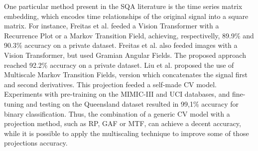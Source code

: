 

One particular method present in the \gls{SQA} literature is the time series matrix embedding, which encodes time relationships of the original signal into a square matrix. For instance, Freitas et al. \cite{imaging-4} feeded a Vision Transformer with a Recurrence Plot or a Markov Transition Field, achieving, respectivelly, 89.9\% and 90.3\% accuracy on a private dataset. Freitas et al. \cite{imaging-5} also feeded images with a Vision Transformer, but used Gramian Angular Fields. The proposed approach reached 92.2\% accuracy on a private dataset. Liu et al. \cite{imaging-6} proposed the use of Multiscale Markov Transition Fields, version which concatenates the signal first and second derivatives. This projection feeded a self-made \gls{CV} model. Experiments with pre-training on the MIMIC-III and UCI databases, and fine-tuning and testing on the Queensland dataset resulted in 99,1\% accuracy for binary classification. Thus, the combination of a generic \gls{CV} model with a projection method, such as \gls{RP}, \gls{GAF} or \gls{MTF}, can achieve a decent accuracy, while it is possible to apply the multiscaling technique to improve some of those projections accuracy. 

